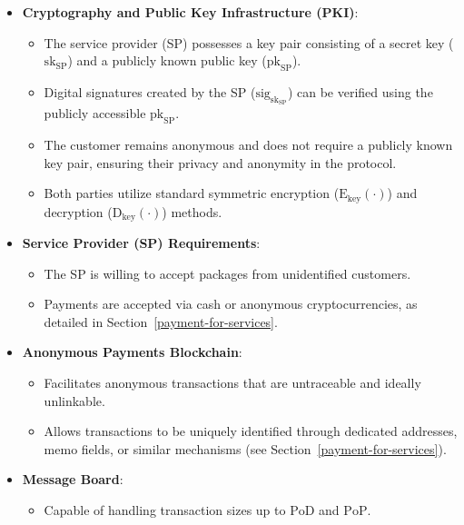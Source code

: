\documentclass[pdftex,twocolumn,epjc3]{svjour3}
\begin{document}
\begin{itemize}

\item \textbf{Cryptography and Public Key Infrastructure (PKI)}:
    \begin{itemize}
        \item The service provider (SP) possesses a key pair consisting of a secret key ($\mathrm{sk}_\mathrm{SP}$) and a publicly known public key ($\mathrm{pk}_\mathrm{SP}$).
        \item Digital signatures created by the SP ($\mathrm{sig}_{\mathrm{sk}_\mathrm{SP}}$) can be verified using the publicly accessible $\mathrm{pk}_\mathrm{SP}$.
        \item The customer remains anonymous and does not require a publicly known key pair, ensuring their privacy and anonymity in the protocol.
        
        \item Both parties utilize standard symmetric encryption ($\mathrm{E}_\mathrm{key}(\cdot)$) and decryption ($\mathrm{D}_\mathrm{key}(\cdot)$) methods.
    \end{itemize}

\item \textbf{Service Provider (SP) Requirements}:
    \begin{itemize}
        \item The SP is willing to accept packages from unidentified customers.
        \item Payments are accepted via cash or anonymous cryptocurrencies, as detailed in Section~\ref{payment-for-services}.
    \end{itemize}
    
\item \textbf{Anonymous Payments Blockchain}:
    \begin{itemize}
        \item Facilitates anonymous transactions that are untraceable and ideally unlinkable.
        \item Allows transactions to be uniquely identified through dedicated addresses, memo fields, or similar mechanisms (see Section~\ref{payment-for-services}).
    \end{itemize}

\item \textbf{Message Board}:
    \begin{itemize}
        \item Capable of handling transaction sizes up to $\mathrm{PoD}$ and $\mathrm{PoP}$.
    \end{itemize}


\end{itemize}
\end{document}
